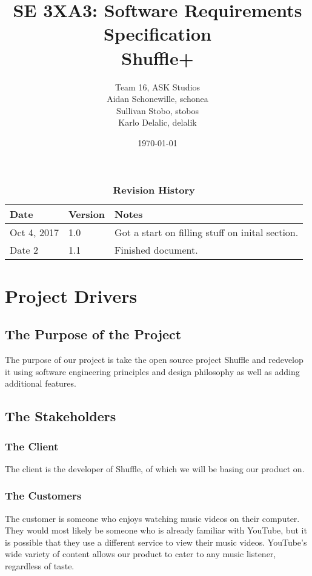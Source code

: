 \documentclass[12pt, titlepage]{article}
\title{SE 3XA3: Software Requirements Specification\\Shuffle+}
\author{Team 16, ASK Studios
		\\ Aidan Schonewille, schonea
		\\ Sullivan Stobo, stobos
		\\ Karlo Delalic, delalik
}
\date{\today}
\begin{document}
\maketitle

\tableofcontents
\listoftables
\listoffigures

\begin{table}[bp]
\caption{\bf Revision History}
\begin{tabularx}{\textwidth}{p{3cm}p{2cm}X}
\toprule {\bf Date} & {\bf Version} & {\bf Notes}\\
\midrule
Oct 4, 2017 & 1.0 & Got a start on filling stuff on inital section.\\
Date 2 & 1.1 & Finished document.\\
\bottomrule
\end{tabularx}
\end{table}

\newpage


\section{Project Drivers}

\subsection{The Purpose of the Project}

The purpose of our project is take the open source project Shuffle and redevelop it using software engineering principles and design philosophy as well as adding additional features.  

\subsection{The Stakeholders}
\subsubsection{The Client}
The client is the developer of Shuffle, of which we will be basing our product on.
\subsubsection{The Customers}
The customer is someone who enjoys watching music videos on their computer.  They would most likely be someone who is already familiar with YouTube, but it is possible that they use a different service to view their music videos.  YouTube's wide variety of content allows our product to cater to any music listener, regardless of taste.
\end{document}
